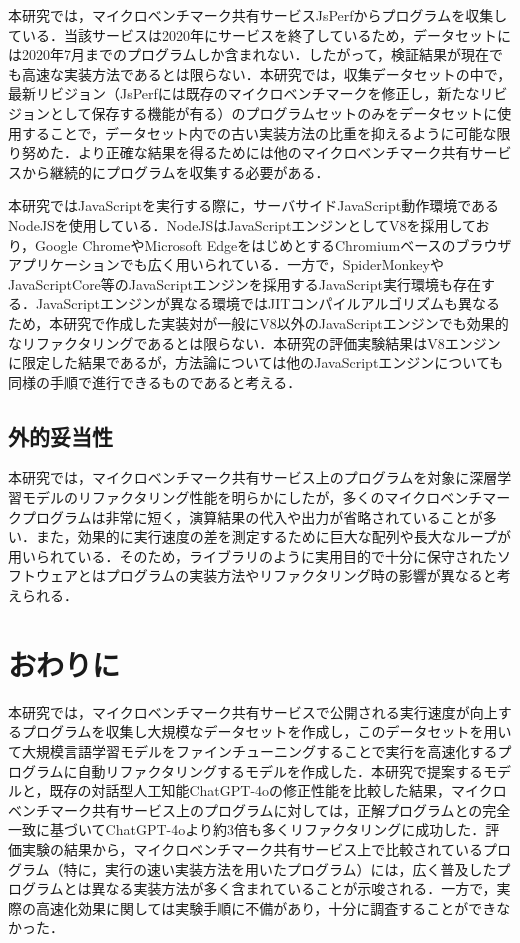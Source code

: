 \documentclass[submit,techrep,noauthor]{ipsj}
\begin{document}
本研究では，マイクロベンチマーク共有サービスJsPerfからプログラムを収集している．当該サービスは2020年にサービスを終了しているため，データセットには2020年7月までのプログラムしか含まれない．したがって，検証結果が現在でも高速な実装方法であるとは限らない．本研究では，収集データセットの中で，最新リビジョン（JsPerfには既存のマイクロベンチマークを修正し，新たなリビジョンとして保存する機能が有る）のプログラムセットのみをデータセットに使用することで，データセット内での古い実装方法の比重を抑えるように可能な限り努めた．より正確な結果を得るためには他のマイクロベンチマーク共有サービスから継続的にプログラムを収集する必要がある．

本研究ではJavaScriptを実行する際に，サーバサイドJavaScript動作環境であるNodeJSを使用している．NodeJSはJavaScriptエンジンとしてV8を採用しており，Google ChromeやMicrosoft EdgeをはじめとするChromiumベースのブラウザアプリケーションでも広く用いられている．一方で，SpiderMonkeyやJavaScriptCore等のJavaScriptエンジンを採用するJavaScript実行環境も存在する．JavaScriptエンジンが異なる環境ではJITコンパイルアルゴリズムも異なるため，本研究で作成した実装対が一般にV8以外のJavaScriptエンジンでも効果的なリファクタリングであるとは限らない．本研究の評価実験結果はV8エンジンに限定した結果であるが，方法論については他のJavaScriptエンジンについても同様の手順で進行できるものであると考える．

\subsection{外的妥当性}
本研究では，マイクロベンチマーク共有サービス上のプログラムを対象に深層学習モデルのリファクタリング性能を明らかにしたが，多くのマイクロベンチマークプログラムは非常に短く，演算結果の代入や出力が省略されていることが多い．また，効果的に実行速度の差を測定するために巨大な配列や長大なループが用いられている．そのため，ライブラリのように実用目的で十分に保守されたソフトウェアとはプログラムの実装方法やリファクタリング時の影響が異なると考えられる．

\section{おわりに}\label{sec:conc}
本研究では，マイクロベンチマーク共有サービスで公開される実行速度が向上するプログラムを収集し大規模なデータセットを作成し，このデータセットを用いて大規模言語学習モデルをファインチューニングすることで実行を高速化するプログラムに自動リファクタリングするモデルを作成した．本研究で提案するモデルと，既存の対話型人工知能ChatGPT-4oの修正性能を比較した結果，マイクロベンチマーク共有サービス上のプログラムに対しては，正解プログラムとの完全一致に基づいてChatGPT-4oより約3倍も多くリファクタリングに成功した．評価実験の結果から，マイクロベンチマーク共有サービス上で比較されているプログラム（特に，実行の速い実装方法を用いたプログラム）には，広く普及したプログラムとは異なる実装方法が多く含まれていることが示唆される．一方で，実際の高速化効果に関しては実験手順に不備があり，十分に調査することができなかった．
\end{document}
